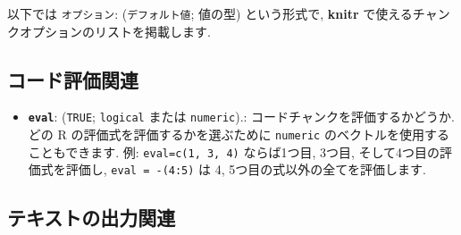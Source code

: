 \documentclass[
  11pt,
]{bxjsreport}
\providecommand{\tightlist}{%
  \setlength{\itemsep}{0pt}\setlength{\parskip}{0pt}}
\begin{document}
以下では \texttt{オプション}: (\texttt{デフォルト値}; 値の型) という形式で, \textbf{knitr} で使えるチャンクオプションのリストを掲載します.

\hypertarget{evaluate}{%
\subsection{コード評価関連}\label{evaluate}}

\begin{itemize}
\tightlist
\item
  \textbf{\texttt{eval}}: (\texttt{TRUE}; \texttt{logical} または \texttt{numeric}).: コードチャンクを評価するかどうか. どの R の評価式を評価するかを選ぶために \texttt{numeric} のベクトルを使用することもできます. 例: \texttt{eval=c(1, 3, 4)} ならば1つ目, 3つ目, そして4つ目の評価式を評価し, \texttt{eval = -(4:5)} は 4, 5つ目の式以外の全てを評価します.
\end{itemize}

\hypertarget{text-output}{%
\subsection{テキストの出力関連}\label{text-output}}
\end{document}
